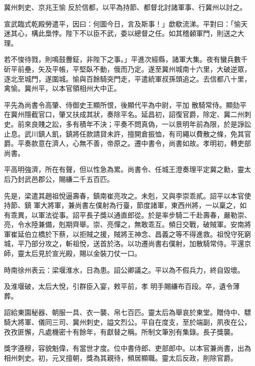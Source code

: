 \begin{pinyinscope}
 冀州刺史、京兆王愉
 反於信都，以平為持節、都督北討諸軍事、行冀州以討之。



 宣武臨式乾殿勞遣平，因曰：何圖今日，言及斯事！」歔欷流涕。平對曰：「愉天迷其心，構此梟悖。陛下不以臣不武，委以總督之任。如其稽顙軍門，則送之大理。



 若不悛待戮，則鳴鼓釁鉦，非陛下之事。」平進次經縣，諸軍大集。夜有蠻兵數千斫平前壘，矢及平帳，平堅臥不動，俄而乃定。遂至冀州城南十六里，大破逆眾，逐北至城門，遂圍城。愉與百餘騎突門走，平遣統軍叔孫頭追之。去信都八十里，禽愉。冀州平，以本官領相州大中正。



 平先為尚書令高肇、侍御史王顯所恨，後顯代平為中尉，平加
 散騎常侍。顯劾平在冀州隱截官口，肇又扶成其狀，奏除平名。延昌初，詔復官爵，除定、冀二州刺史。前來良賤之訟，多有積年不決；平奏不問真偽，一以景明年前為限，於是諍訟止息。武川鎮人飢，鎮將任款請貸未許，擅開倉振恤，有司繩以費散之條，免其官爵。平奏款意在濟人，心無不善，帝原之。遷中書令，尚書如故。孝明初，轉吏部尚書。



 平高明強濟，所在有聲，但以性急為累。尚書令、任城王澄奏理平定冀之勳，靈太后乃封武邑郡公，賜縑二千五百匹。



 先是，梁遣其趙祖悅逼壽春，鎮南崔亮攻之。未剋，又與李崇乖貳。詔平以本官使持節、鎮
 軍大將軍，兼尚書左僕射為行臺，節度諸軍，東西州將，一以稟之，如有乖異，以軍法從事。詔平長子獎以通直郎從。於是率步騎二千赴壽春，嚴勒崇、亮，令水陸兼備，剋期齊舉。崇、亮憚之，無敢乖互。頻日交戰，破賊軍。安南將軍崔延伯立橋於下蔡，以拒賊之援，賊將王神念、昌義之等不得進救。祖悅守死窮城，平乃部分攻之，斬祖悅，送首於洛。以功遷尚書右僕射，加散騎常侍。平還京師，靈太后見於宣光殿，賜以金裝刀仗一口。



 時南徐州表云：梁堰淮水，日為患。詔公卿議之。平以為不假兵力，終自毀壞。



 及淮堰破，太后大悅，引群臣入宴，敕平前，孝
 明手賜縑布百段。卒，遺令薄葬。



 詔給東園秘器、朝服一具、衣一襲、帛七百匹。靈太后為舉哀於東堂。贈侍中、驃騎大將軍、儀同三司、冀州刺史，謚文烈公。平自在度支，至於端副，夙夜在公，孜孜匪懈，凡處機密十有餘年，有獻替之稱。所制文筆別有集錄。長子獎襲。



 獎字遵穆，容貌魁偉，有當世才度。位中書侍郎、吏部郎中。以本官兼尚書，出為相州刺史。初，元叉擅朝，獎為其親待，頻居顯職。靈太后反政，削除官爵。




\end{pinyinscope}
